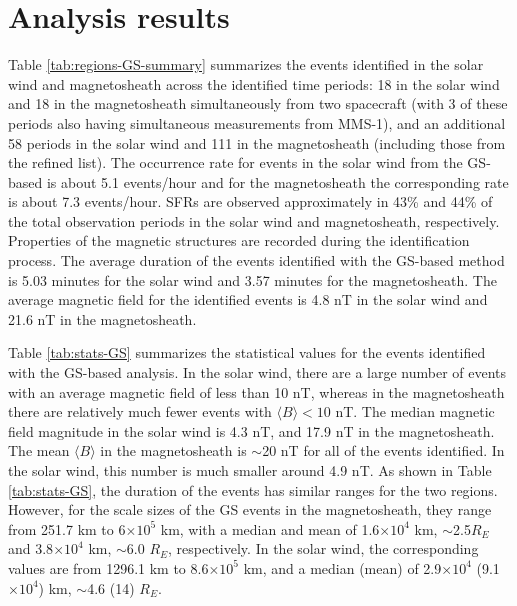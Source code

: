 \section{Analysis results}
Table \ref{tab:regions-GS-summary} summarizes the events identified in the solar wind and magnetosheath across the identified time periods: 18 in the solar wind and 18 in the magnetosheath simultaneously from two spacecraft (with 3 of these periods also having simultaneous measurements from MMS-1), and an additional 58 periods in the solar wind and 111 in the magnetosheath (including those from the refined \cite{ToyEdens:2024} list). The occurrence rate for events in the solar wind from the GS-based is about 5.1 events/hour and for the magnetosheath the corresponding rate is about 7.3 events/hour. SFRs are observed approximately in 43\% and 44\% of the total observation periods in the solar wind and magnetosheath, respectively. Properties of the magnetic structures are recorded during the identification process. The average duration of the events identified with the GS-based method is 5.03 minutes for the solar wind and 3.57 minutes for the magnetosheath. The average magnetic field for the identified events is 4.8 nT in the solar wind and 21.6 nT in the magnetosheath.

\begin{table}
    \centering
    \caption{Summary table for identified events in the solar wind and magnetosheath via the GS-based reconstruction identification algorithm.}
    
    \label{tab:regions-GS-summary}
\end{table}

Table \ref{tab:stats-GS} summarizes the statistical values for the events identified with the GS-based analysis. In the solar wind, there are a large number of events with an average magnetic field of less than 10 nT, whereas in the magnetosheath there are relatively much fewer events with $\langle B\rangle < 10$ nT. The median magnetic field magnitude in the solar wind is 4.3 nT, and 17.9 nT in the magnetosheath. The mean $\langle B\rangle$ in the magnetosheath is $\sim$20 nT for all of the events identified. In the solar wind, this number is much smaller around 4.9 nT. As shown in Table \ref{tab:stats-GS}, the duration of the events has similar ranges for the two regions. However, for the scale sizes of the GS events in the magnetosheath, they range from 251.7 km to 6$\times 10^5$ km, with a median and mean of 1.6$\times 10^4$ km, $\sim$2.5$R_E$ and 3.8$\times 10^4$ km, $\sim$6.0 $R_E$, respectively. In the solar wind, the corresponding values are from 1296.1 km to 8.6$\times 10^5$ km, and a median (mean) of 2.9$\times 10^4$ (9.1$\times 10^4$) km, $\sim$4.6 (14) $R_E$.

